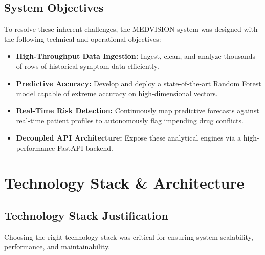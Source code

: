 \documentclass[12pt,a4paper]{report}
\begin{document}
\section{System Objectives}
To resolve these inherent challenges, the MEDVISION system was designed with the following technical and operational objectives:
\begin{itemize}
    \item \textbf{High-Throughput Data Ingestion:} Ingest, clean, and analyze thousands of rows of historical symptom data efficiently.
    \item \textbf{Predictive Accuracy:} Develop and deploy a state-of-the-art Random Forest model capable of extreme accuracy on high-dimensional vectors.
    \item \textbf{Real-Time Risk Detection:} Continuously map predictive forecasts against real-time patient profiles to autonomously flag impending drug conflicts.
    \item \textbf{Decoupled API Architecture:} Expose these analytical engines via a high-performance FastAPI backend.
\end{itemize}

\chapter{Technology Stack \& Architecture}

\section{Technology Stack Justification}
Choosing the right technology stack was critical for ensuring system scalability, performance, and maintainability.
\end{document}
